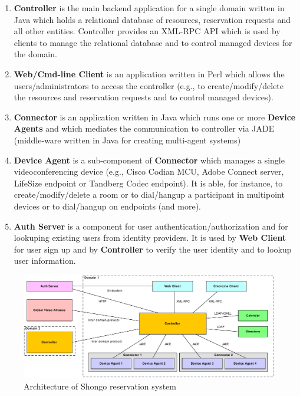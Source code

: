 \begin{enumerate}

\item \textbf{Controller} is the main backend application for a single domain written in Java which holds a relational database of resources, reservation requests and all other entities. Controller provides an XML-RPC API which is used by clients to manage the relational database and to control managed devices for the domain.

\item \textbf{Web/Cmd-line Client} is an application written in Perl which allows the users/administrators to access the controller (e.g., to create/modify/delete the resources and reservation requests and to control managed devices).

\item \textbf{Connector} is an application written in Java which runs one or more \textbf{Device Agents} and which mediates the communication to controller via JADE (middle-ware written in Java for creating multi-agent systems)

\item \textbf{Device Agent} is a sub-component of \textbf{Connector} which manages a single videoconferencing device (e.g., Cisco Codian MCU, Adobe Connect server, LifeSize endpoint or Tandberg Codec endpoint). It is able, for instance, to create/modify/delete a room or to dial/hangup a participant in multipoint devices or to dial/hangup on endpoints (and more).

\item \textbf{Auth Server} is a component for user authentication/authorization and for lookuping existing users from identity providers. It is used by \textbf{Web Client} for user sign up and by \textbf{Controller} to verify the user identity and to lookup user information.

\end{enumerate}

\begin{figure}[ht!]
\includegraphics[width=\textwidth]{diagrams/dd_architecture}
\caption{Architecture of Shongo reservation system}
\label{fig:architecture}
\end{figure}

